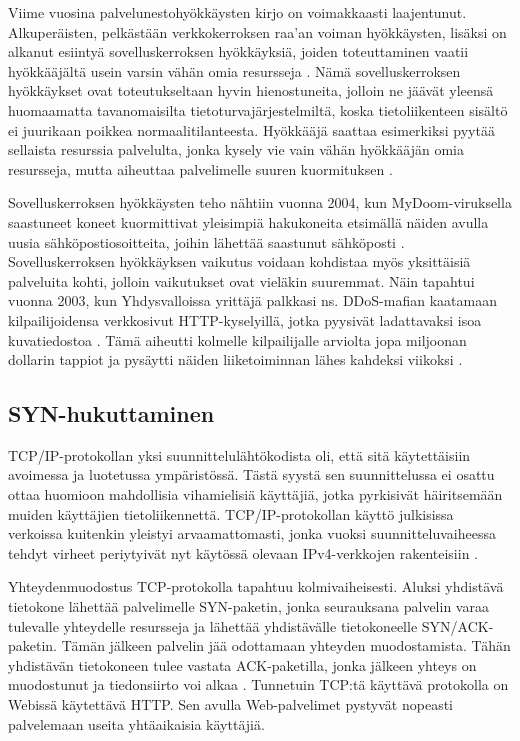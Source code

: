Viime vuosina palvelunestohyökkäysten kirjo on voimakkaasti
laajentunut. Alkuperäisten, pelkästään verkkokerroksen raa’an voiman
hyökkäysten, lisäksi on alkanut esiintyä sovelluskerroksen
hyökkäyksiä, joiden toteuttaminen vaatii hyökkääjältä usein varsin
vähän omia resursseja \cite{Hacking}. Nämä sovelluskerroksen
hyökkäykset ovat toteutukseltaan hyvin hienostuneita, jolloin ne
jäävät yleensä huomaamatta tavanomaisilta tietoturvajärjestelmiltä,
koska tietoliikenteen sisältö ei juurikaan poikkea
normaalitilanteesta. Hyökkääjä saattaa esimerkiksi pyytää sellaista
resurssia palvelulta, jonka kysely vie vain vähän hyökkääjän omia
resursseja, mutta aiheuttaa palvelimelle suuren kuormituksen
\cite{DDOSb}.

Sovelluskerroksen hyökkäysten teho nähtiin vuonna 2004, kun
MyDoom-\-viruksella saastuneet koneet kuormittivat yleisimpiä
hakukoneita etsimällä näiden avulla uusia sähköpostiosoitteita, joihin
lähettää saastunut sähköposti \cite{Hacking}. Sovelluskerroksen
hyökkäyksen vaikutus voidaan kohdistaa myös yksittäisiä palveluita
kohti, jolloin vaikutukset ovat vieläkin suuremmat. Näin tapahtui
vuonna 2003, kun Yhdysvalloissa yrittäjä palkkasi ns. DDoS-mafian
kaatamaan kilpailijoidensa verkkosivut HTTP-kyselyillä, jotka pyysivät
ladattavaksi isoa kuvatiedostoa \cite{DDOSb}. Tämä aiheutti kolmelle
kilpailijalle arviolta jopa miljoonan dollarin tappiot ja pysäytti
näiden liiketoiminnan lähes kahdeksi viikoksi \cite{FBI}.

\subsection{SYN-hukuttaminen}
TCP/IP-protokollan yksi suunnittelulähtökodista oli, että sitä
käytettäisiin avoimessa ja luotetussa ympäristössä. Tästä syystä sen
suunnittelussa ei osattu ottaa huomioon mahdollisia vihamielisiä
käyttäjiä, jotka pyrkisivät häiritsemään muiden käyttäjien
tietoliikennettä. TCP/IP-protokollan käyttö julkisissa verkoissa kuitenkin
yleistyi arvaamattomasti, jonka vuoksi suunnitteluvaiheessa tehdyt
virheet periytyivät nyt käytössä olevaan IPv4-verkkojen rakenteisiin
\cite{Hacking}.

Yhteydenmuodostus TCP-protokolla tapahtuu kolmivaiheisesti. Aluksi
yhdistävä tietokone lähettää palvelimelle SYN-paketin, jonka
seurauksana palvelin varaa tulevalle yhteydelle resursseja ja lähettää
yhdistävälle tietokoneelle SYN/ACK-paketin. Tämän jälkeen palvelin
jää odottamaan yhteyden muodostamista. Tähän yhdistävän tietokoneen
tulee vastata ACK-paketilla, jonka jälkeen yhteys on muodostunut ja
tiedonsiirto voi alkaa \cite{Hacking}. Tunnetuin TCP:tä käyttävä
protokolla on Webissä käytettävä HTTP. Sen avulla Web-palvelimet
pystyvät nopeasti palvelemaan useita yhtäaikaisia käyttäjiä.

